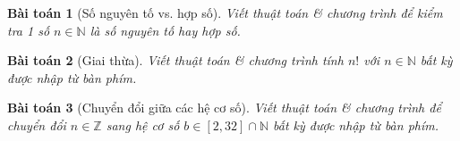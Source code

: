 \documentclass{article}
\numberwithin{equation}{section}
\newtheorem{baitoan}{Bài toán}[section]
\begin{document}
\begin{baitoan}[Số nguyên tố vs. hợp số]
	Viết thuật toán \& chương trình để kiểm tra 1 số $n\in\mathbb{N}$ là số nguyên tố hay hợp số.
\end{baitoan}

\begin{baitoan}[Giai thừa]
	Viết thuật toán \& chương trình tính $n!$ với $n\in\mathbb{N}$ bất kỳ được nhập từ bàn phím.
\end{baitoan}

\begin{baitoan}[Chuyển đổi giữa các hệ cơ số]
	Viết thuật toán \& chương trình để chuyển đổi $n\in\mathbb{Z}$ sang hệ cơ số $b\in[2,32]\cap\mathbb{N}$ bất kỳ được nhập từ bàn phím.
\end{baitoan}


\printbibliography[heading=bibintoc]
	
\end{document}
